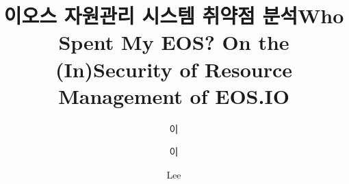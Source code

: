 \documentclass[master,english,final,pdfdoc]{kaist-ucs-improved}
\title[korean] {이오스 자원관리 시스템 취약점 분석}
\title[english]{Who Spent My EOS? On the (In)Security of Resource Management of EOS.IO}
\author[korean]{이}{상 섭}
\author[korean2]{이}{상섭}    %
\author[chinese]{}{} %
\author[english]{Lee}{Sangsup}
\begin{document}
 


		\thesisinfo
   
   

		
		

    \addtocounter{pagemarker}{1}                 %
    \newpage  
  
		\iffinal
			\tableofcontents

			\listoftables

			\listoffigures
		\else
			\label{paperlastromanpagelabel} %
		\fi

\end{document}
